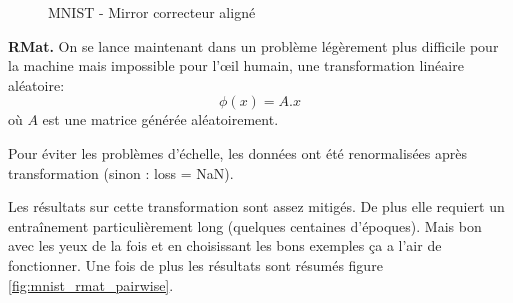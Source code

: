\begin{figure}[H] %
\centering
{}
\hfill
{}
\caption{MNIST - Mirror correcteur aligné}
\label{fig:mnist_mirror_pairwise}
\end{figure}


{\Large\textbf{RMat.}} On se lance maintenant dans un problème légèrement plus
difficile pour la machine mais impossible pour l'œil humain, une transformation
linéaire aléatoire:
$$ \phi(x) = A.x$$
où $A$ est une matrice générée aléatoirement.

Pour éviter les problèmes d'échelle, les données ont été renormalisées après 
transformation (sinon : loss = NaN).

Les résultats sur cette transformation sont assez mitigés. De plus elle requiert
un entraînement particulièrement long (quelques centaines d'époques). Mais bon avec
les yeux de la fois et en choisissant les bons exemples ça a l'air de fonctionner.
Une fois de plus les résultats sont résumés figure \ref{fig:mnist_rmat_pairwise}.

